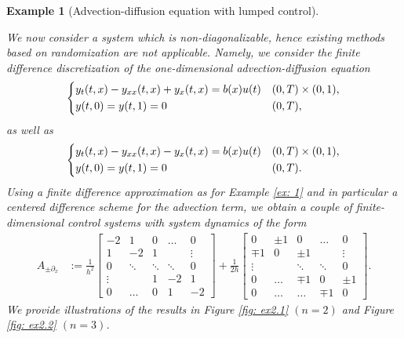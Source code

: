 \documentclass[11pt, a4paper, reqno]{amsart}
\newcommand{\del}{\partial}
\theoremstyle{plain}
\numberwithin{equation}{section}
\newtheorem{example}{Example}[section]
\begin{document}
	
	\begin{example}[Advection-diffusion equation with lumped control] \label{ex: 2}
	
	We now consider a system which is non-diagonalizable, hence existing methods based on randomization are not applicable.
 Namely, we consider the finite difference discretization of the one-dimensional advection-diffusion equation
	\begin{equation*}
	\begin{dcases}
	y_t(t,x) - y_{xx}(t,x) + y_x(t,x) = b(x) u(t) &(0,T)\times (0,1),\\
	y(t,0) = y(t,1) = 0 &(0,T),\\
	\end{dcases}
	\end{equation*}
	as well as
	\begin{equation*}
	\begin{dcases}
	y_t(t,x) - y_{xx}(t,x) - y_x(t,x) = b(x) u(t) &(0,T)\times (0,1),\\
	y(t,0) = y(t,1) = 0 &(0,T).\\
	\end{dcases}
	\end{equation*}
	Using a finite difference approximation as for Example \ref{ex: 1} and in particular a centered difference scheme for the advection term, we obtain a couple of finite-dimensional control systems with system dynamics of the form
	\begin{align*}
	A_{\pm\del_x} &:= \frac{1}{h^2}
	\begin{bmatrix} 
           -2& 1& 0& \ldots& 0 \\ 
           1& -2& 1& & \vdots \\
           0& \ddots &\ddots& \ddots& 0 \\
           \vdots& & 1 & -2 & 1 \\
           0& \hdots &0 &1 & -2 
    \end{bmatrix}  + \frac{1}{2h} \begin{bmatrix} 0& \pm1& 0& \ldots& 0 \\ 
						     \mp1& 0& \pm1& & \vdots \\
						     \vdots&  &\ddots& \ddots& 0 \\
						     0& \ldots& \mp1 & 0 & \pm1 \\
						     0& \hdots &\hdots &\mp1 & 0  
				\end{bmatrix}.
	\end{align*}
	We provide illustrations of the results in Figure \ref{fig: ex2.1} $(n=2)$ and Figure \ref{fig: ex2.2} $(n=3)$.
	

\end{example}
\end{document}
